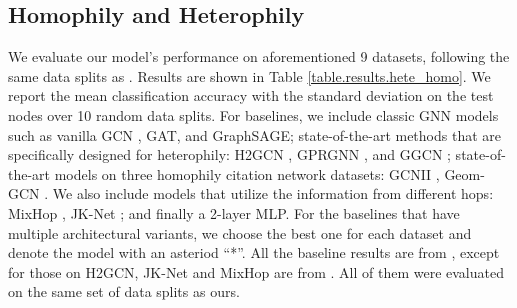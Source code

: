 \documentclass{article}
\begin{document}
\subsection{Homophily and Heterophily}
\label{setting_homo_hete}
We evaluate our model's performance on aforementioned 9 datasets, following the same data splits as \citet{pei2020geom}. Results are shown in Table \ref{table.results.hete_homo}. We report the mean classification accuracy with the standard deviation on the test nodes over 10 random data splits. For baselines, we include classic GNN models such as vanilla GCN \citep{kipf2016semi}, GAT\citep{velivckovic2017graph}, and GraphSAGE\citep{hamilton2017inductive}; state-of-the-art methods that are specifically designed for heterophily: H2GCN \citep{zhu2020beyond}, GPRGNN \citep{chien2020adaptive}, and GGCN \citep{yan2021two}; state-of-the-art models on three homophily citation network datasets: GCNII \citep{chen2020simple}, Geom-GCN \citep{pei2020geom}. We also include models that utilize the information from different hops: MixHop \citep{abu2019mixhop}, JK-Net \citep{xu2018representation}; and finally a 2-layer MLP. For the baselines that have multiple architectural variants, we choose the best one for each dataset and denote the model with an asteriod ``*''. All the baseline results are from \citet{yan2021two}, except for those on H2GCN, JK-Net and MixHop are from \citet{zhu2020beyond}. All of them were evaluated on the same set of data splits as ours.
\end{document}
